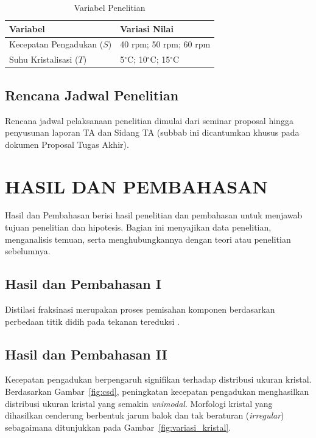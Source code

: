 \documentclass[skripsi,laporan]{itkta2025}
\begin{document}
\begin{table}[htbp]
  \centering
  \caption{Variabel Penelitian}
  \label{tab:variabel_skripsi}
  \begin{singlespace}
  \begin{tabular}{@{}p{5cm}p{6cm}@{}}
    \toprule
    \textbf{Variabel} & \textbf{Variasi Nilai} \\
    \midrule
    Kecepatan Pengadukan ($S$) & 40 rpm; 50 rpm; 60 rpm \\
    Suhu Kristalisasi ($T$)    & 5$^\circ$C; 10$^\circ$C; 15$^\circ$C \\
    \bottomrule
  \end{tabular}
  \end{singlespace}
\end{table}

\section{Rencana Jadwal Penelitian}
Rencana jadwal pelaksanaan penelitian dimulai dari seminar proposal hingga penyusunan laporan TA dan Sidang TA (subbab ini dicantumkan khusus pada dokumen Proposal Tugas Akhir).

\chapter{HASIL DAN PEMBAHASAN}
Hasil dan Pembahasan berisi hasil penelitian dan pembahasan untuk menjawab tujuan penelitian dan hipotesis. Bagian ini menyajikan data penelitian, menganalisis temuan, serta menghubungkannya dengan teori atau penelitian sebelumnya.

\section{Hasil dan Pembahasan I}
Distilasi fraksinasi merupakan proses pemisahan komponen berdasarkan perbedaan titik didih pada tekanan tereduksi \citep{mamun2008, isfaroiny2005, yudisthira2009, widiyanto2010}.

\section{Hasil dan Pembahasan II}
Kecepatan pengadukan berpengaruh signifikan terhadap distribusi ukuran kristal. Berdasarkan Gambar~\ref{fig:csd}, peningkatan kecepatan pengadukan menghasilkan distribusi ukuran kristal yang semakin \textit{unimodal}. Morfologi kristal yang dihasilkan cenderung berbentuk jarum balok dan tak beraturan (\textit{irregular}) sebagaimana ditunjukkan pada Gambar~\ref{fig:variasi_kristal}.
\end{document}
